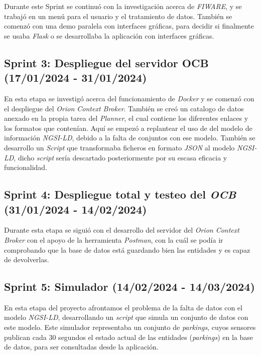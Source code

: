 Durante este Sprint se continuó con la investigación acerca de \textit{FIWARE}, y se trabajó en un menú para el usuario y el tratamiento de datos.
También se comenzó con una demo paralela con interfaces gráficas, para decidir si finalmente se usaba \textit{Flask} o se desarrollaba la aplicación con interfaces gráficas.


\subsection{Sprint 3: Despliegue del servidor OCB (17/01/2024 - 31/01/2024)}

En esta etapa se investigó acerca del funcionamiento de \textit{Docker} y se comenzó con el despliegue del \textit{Orion Context Broker}.
También se creó un catalogo de datos anexado en la propia tarea del \textit{Planner}, el cual contiene los diferentes enlaces y los formatos que contenían. Aquí se empezó a replantear el uso de del modelo de información \textit{NGSI-LD}, debido a la falta de conjuntos con ese modelo.
También se desarrollo un \textit{Script} que transformaba ficheros en formato \textit{JSON} al modelo \textit{NGSI-LD}, dicho \textit{script} sería descartado posteriormente por su escasa eficacia y funcionalidad.


\subsection{Sprint 4: Despliegue total y testeo del \textit{OCB} (31/01/2024 - 14/02/2024)}

Durante esta etapa se siguió con el desarrollo del servidor del \textit{Orion Context Broker} con el apoyo de la herramienta \textit{Postman}, con la cuál se podía ir comprobando que la base de datos está guardando bien las entidades y es capaz de devolverlas.


\subsection{Sprint 5: Simulador (14/02/2024 - 14/03/2024)}

En esta etapa del proyecto afrontamos el problema de la falta de datos con el modelo \textit{NGSI-LD}, desarrollando un \textit{script} que simula un conjunto de datos con este modelo.
Este simulador representaba un conjunto de \textit{parkings}, cuyos sensores publican cada 30 segundos el estado actual de las entidades (\textit{parkings}) en la base de datos, para ser consultadas desde la aplicación.

